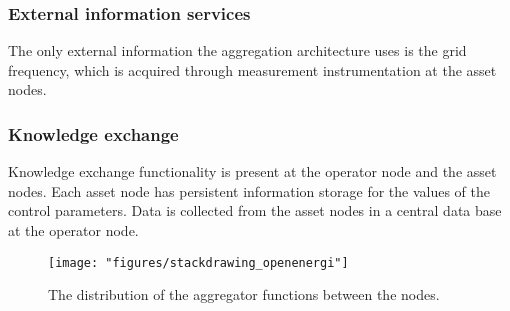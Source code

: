 \subsubsection{External information services}
The only external information the aggregation architecture uses is the grid frequency, which is acquired through measurement instrumentation at the asset nodes.
\subsubsection{Knowledge exchange}
Knowledge exchange functionality is present at the operator node and the asset nodes. Each asset node has persistent information storage for the values of the control parameters. Data is collected from the asset nodes in a central data base at the operator node. 
\begin{figure}[htb]
\centering
\texttt{[image: "figures/stackdrawing\_openenergi"]}
\caption{The distribution of the aggregator functions between the nodes.}
\label{fig:openenergi}
\end{figure}
